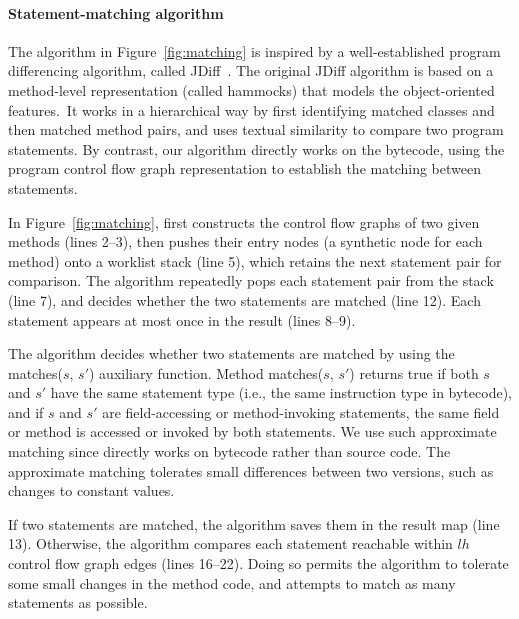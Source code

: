 \paragraph{Statement-matching algorithm}

The algorithm in Figure~\ref{fig:matching} is inspired by
a well-established program differencing algorithm, called
JDiff~\cite{Apiwattanapong:2004}. The original JDiff
algorithm is based on a method-level representation
(called hammocks) that models the object-oriented features.\
It works in a hierarchical way by first identifying matched
classes and then matched method pairs, and uses
textual similarity to compare two program statements. By contrast, our
algorithm directly works on the bytecode, using the program control flow graph
representation to establish the matching between statements.

In Figure~\ref{fig:matching}, \ourtool first constructs the control
flow graphs of two given methods (lines 2--3), then pushes their
entry nodes (a synthetic node for each method) onto a worklist stack (line 5), which retains
the next statement pair for comparison. The algorithm repeatedly
pops each statement pair from the stack (line 7), and
decides whether the two statements are matched (line 12).  
Each statement appears at most once in the result (lines 8--9).

The algorithm decides whether two statements are matched by using
the matches($\mathit{s}$, $\mathit{s'}$) auxiliary function. Method
matches($\mathit{s}$, $\mathit{s'}$) returns true if both
$\mathit{s}$ and $\mathit{s'}$ have the same statement type (i.e.,
the same instruction type in bytecode), and if $\mathit{s}$ and
$\mathit{s'}$ are field-accessing or method-invoking statements,
the same field or method is accessed or invoked
by both statements.
We use such approximate matching since \ourtool directly works
on bytecode rather than source code. The approximate matching
tolerates small differences
between two versions, such as changes to constant values.


If two statements are matched, the algorithm saves them in the
result map (line 13). Otherwise,
the algorithm compares each statement reachable within $lh$
control flow graph edges (lines 16--22). Doing so permits the algorithm to tolerate some small
changes in the method code, and attempts to match as many statements as possible.

